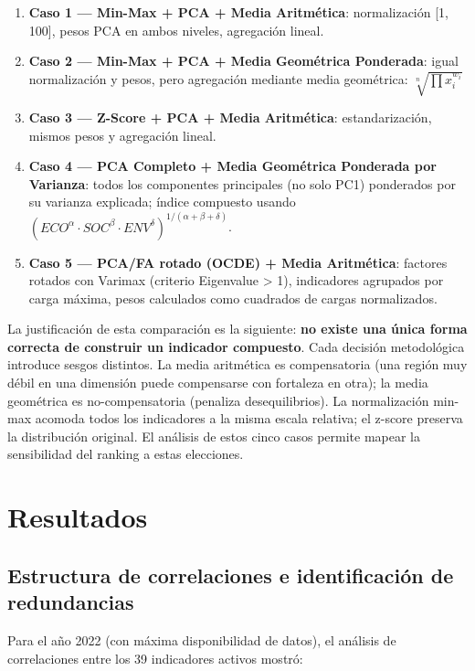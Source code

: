 \begin{enumerate}
    \item \textbf{Caso 1 — Min-Max + PCA + Media Aritmética}: normalización [1, 100], pesos PCA en ambos niveles, agregación lineal.
    \item \textbf{Caso 2 — Min-Max + PCA + Media Geométrica Ponderada}: igual normalización y pesos, pero agregación mediante media geométrica: $\sqrt[n]{\prod x_i^{w_i}}$
    \item \textbf{Caso 3 — Z-Score + PCA + Media Aritmética}: estandarización, mismos pesos y agregación lineal.
    \item \textbf{Caso 4 — PCA Completo + Media Geométrica Ponderada por Varianza}: todos los componentes principales (no solo PC1) ponderados por su varianza explicada; índice compuesto usando $(ECO^{\alpha} \cdot SOC^{\beta} \cdot ENV^{\delta})^{1/(\alpha + \beta + \delta)}$.
    \item \textbf{Caso 5 — PCA/FA rotado (OCDE) + Media Aritmética}: factores rotados con Varimax (criterio Eigenvalue > 1), indicadores agrupados por carga máxima, pesos calculados como cuadrados de cargas normalizados.
\end{enumerate}

La justificación de esta comparación es la siguiente: \textbf{no existe una única forma correcta de construir un indicador compuesto}. Cada decisión metodológica introduce sesgos distintos. La media aritmética es compensatoria (una región muy débil en una dimensión puede compensarse con fortaleza en otra); la media geométrica es no-compensatoria (penaliza desequilibrios). La normalización min-max acomoda todos los indicadores a la misma escala relativa; el z-score preserva la distribución original. El análisis de estos cinco casos permite mapear la sensibilidad del ranking a estas elecciones.

\chapter{Resultados}

\section{Estructura de correlaciones e identificación de redundancias}

Para el año 2022 (con máxima disponibilidad de datos), el análisis de correlaciones entre los 39 indicadores activos mostró:

